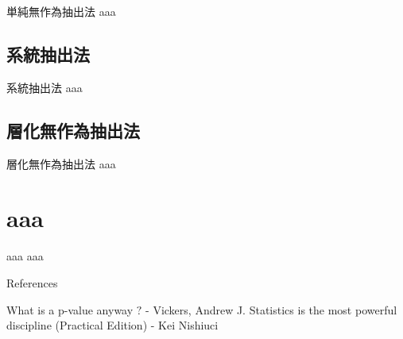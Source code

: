 \documentclass[dvipdfmx, autodetect-engine, aspectratio=169, 10.5pt]{beamer}
\begin{document}
\begin{frame}{単純無作為抽出法}
	aaa
\end{frame}

\subsection{系統抽出法}

\begin{frame}{系統抽出法}
	aaa
\end{frame}

\subsection{層化無作為抽出法}

\begin{frame}{層化無作為抽出法}
	aaa
\end{frame}

\section{aaa}

\begin{frame}{aaa}
	aaa
\end{frame}


\begin{frame}[allowframebreaks]{References}
	\begin{thebibliography}{9}
		What is a p-value anyway $?$ - Vickers, Andrew J.
		Statistics is the most powerful discipline (Practical Edition) - Kei Nishiuci
	\end{thebibliography}
\end{frame}
\end{document}
